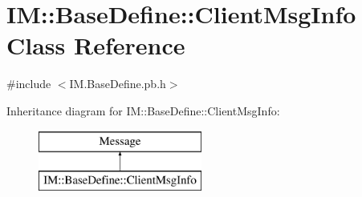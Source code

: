 \hypertarget{class_i_m_1_1_base_define_1_1_client_msg_info}{}\section{I\+M\+:\+:Base\+Define\+:\+:Client\+Msg\+Info Class Reference}
\label{class_i_m_1_1_base_define_1_1_client_msg_info}


{\ttfamily \#include $<$I\+M.\+Base\+Define.\+pb.\+h$>$}

Inheritance diagram for I\+M\+:\+:Base\+Define\+:\+:Client\+Msg\+Info\+:\begin{figure}[H]
\begin{center}
\leavevmode
\includegraphics[height=2.000000cm]{class_i_m_1_1_base_define_1_1_client_msg_info}
\end{center}
\end{figure}
